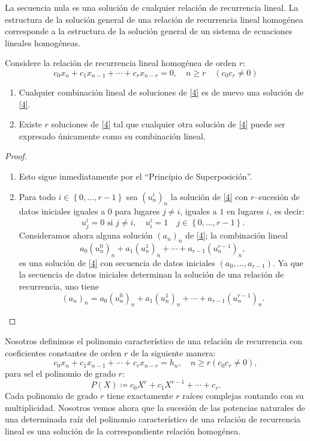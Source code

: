 La secuencia nula es una solución de cualquier relación de recurrencia lineal. La estructura de la solución general de una relación de recurrencia lineal homogénea corresponde a la estructura de la solución general de un sistema de ecuaciones lineales homogéneas.
\begin{proposition}{}
	Considere la relación de recurrencia lineal homogénea de orden $r$:
		\begin{equation}\label{4}
			c_{0}x_{n}+c_{1}x_{n-1}+\cdots+c_{r}x_{n-r}=0,\quad n\geq r\quad\left(c_{0}c_{r}\neq0\right)
		\end{equation}
		\begin{enumerate}
			\item Cualquier combinación lineal de soluciones de \eqref{4} es de nuevo una solución de \eqref{4}.
			\item Existe $r$ soluciones de \eqref{4} tal que cualquier otra solución de \eqref{4} puede ser expresado únicamente como su combinación lineal.
	\end{enumerate}
\end{proposition}

\begin{proof}
	\begin{enumerate}
		\item Esto sigue inmediatamente por el ``Principio de Superposición''.
		\item Para todo $i\in\left\{0,\ldots,r-1 \right\}$ sea $\left(u^{i}_{n}\right)_{n}$ la solución de \eqref{4} con $r$--sucesión de datos iniciales iguales a $0$ para lugares $j\neq i$, iguales a $1$ en lugares $i$, es decir: \[ u^{i}_{j}=0\text{ si }j\neq i,\quad u^{i}_{i}=1\quad j\in\left\{0,\ldots,r-1 \right\}. \]
		Consideramos ahora alguna solución $(a_{n})_{n}$ de \eqref{4}; la combinación lineal \[ a_{0}{\left(u^{0}_{n}\right)}_{n}+a_{1}{\left(u^{1}_{n}\right)}_{n}+\cdots+a_{r-1}(u^{r-1}_{n})_{n}, \]	es una solución de \eqref{4} con secuencia de datos iniciales $\left(a_{0},\ldots,a_{r-1}\right)$. Ya que la secuencia de datos iniciales determinan la solución de una relación de recurrencia, uno tiene \[ {\left(a_{n}\right)}_{n}=a_{0}\left(u^{0}_{n}\right)_{n}+a_{1}\left(u^{1}_{n}\right)_{n}+\cdots+a_{r-1}\left(u^{r-1}_{n}\right)_{n}. \]
	\end{enumerate}
\end{proof}

\begin{definition}
	Nosotros definimos el polinomio característico de una relación de recurrencia con coeficientes constantes de orden $r$ de la siguiente manera: \[ c_{0}x_{n}+c_{1}x_{n-1}+\cdots+c_{r}x_{n-r}=h_{n},\quad n\geq r\left(c_{0}c_{r}\neq0\right), \] para sel el polinomio de grado $r$: \[ P(X)\coloneqq c_{0}X^{r}+c_{1}X^{r-1}+\cdots+c_{r}. \] Cada polinomio de grado $r$ tiene exactamente $r$ raíces complejas contando con su multiplicidad. Nosotros vemos ahora que la sucesión de las potencias naturales de una determinada raíz del polinomio característico de una relación de recurrencia lineal es una solución de la correspondiente relación homogénea.
\end{definition}

